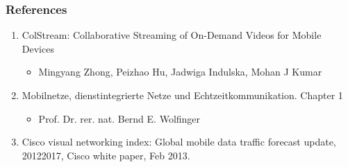 \documentclass{beamer} %
\begin{document}
\begin{frame}
\frametitle{References}
\begin{enumerate}
\item ColStream: Collaborative Streaming of On-Demand Videos for Mobile Devices
\begin{itemize}
\item Mingyang Zhong, Peizhao Hu, Jadwiga Indulska, Mohan J Kumar
\end{itemize}
\item Mobilnetze, dienstintegrierte Netze und Echtzeitkommunikation. Chapter 1
\begin{itemize}
\item Prof. Dr. rer. nat. Bernd E. Wolfinger
\end{itemize}
\item Cisco visual networking index: Global mobile data traffic forecast update, 20122017, Cisco white paper, Feb 2013.
\end{enumerate}
\end{frame}

\end{document}

